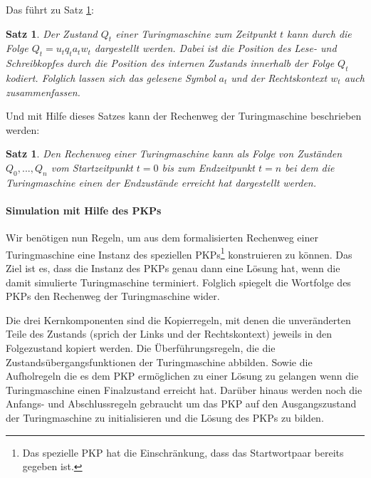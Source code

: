 \documentclass[]{scrartcl}
\newtheorem{satz}[definition]{Satz}
\begin{document}
			Das führt zu Satz \ref{satz-Turing-Zustand}:
			
			\begin{satz}
			\label{satz-Turing-Zustand}
			Der Zustand $Q_t$ einer Turingmaschine zum Zeitpunkt $t$ kann durch die Folge $Q_t = u_tq_ta_tw_t$ dargestellt werden. Dabei ist die Position des Lese- und Schreibkopfes durch die Position des internen Zustands innerhalb der Folge $Q_t$ kodiert. Folglich lassen sich das gelesene Symbol $a_t$ und der Rechtskontext $w_t$ auch zusammenfassen.
			\end{satz}
			
			Und mit Hilfe dieses Satzes kann der Rechenweg der Turingmaschine beschrieben werden:
			
			\begin{satz}
			Den Rechenweg einer Turingmaschine kann als Folge von Zuständen $Q_0, ..., Q_n$ vom Startzeitpunkt $t = 0$ bis zum Endzeitpunkt $t = n$ bei dem die Turingmaschine einen der Endzustände erreicht hat dargestellt werden.
			\end{satz}
		
		\paragraph{Simulation mit Hilfe des PKPs}
			Wir benötigen nun Regeln, um aus dem formalisierten Rechenweg einer Turingmaschine eine Instanz des speziellen PKPs\footnote{Das spezielle PKP hat die Einschränkung, dass das Startwortpaar bereits gegeben ist.} konstruieren zu können. Das Ziel ist es, dass die Instanz des PKPs genau dann eine Lösung hat, wenn die damit simulierte Turingmaschine terminiert. Folglich spiegelt die Wortfolge des PKPs den Rechenweg der Turingmaschine wider.
			
			Die drei Kernkomponenten sind die Kopierregeln, mit denen die unveränderten Teile des Zustands (sprich der Links und der Rechtskontext) jeweils in den Folgezustand kopiert werden. Die Überführungsregeln, die die Zustandsübergangsfunktionen der Turingmaschine abbilden. Sowie die Aufholregeln die es dem PKP ermöglichen zu einer Lösung zu gelangen wenn die Turingmaschine einen Finalzustand erreicht hat. Darüber hinaus werden noch die Anfangs- und Abschlussregeln gebraucht um das PKP auf den Ausgangszustand der Turingmaschine zu initialisieren und die Lösung des PKPs zu bilden.
			
\end{document}
